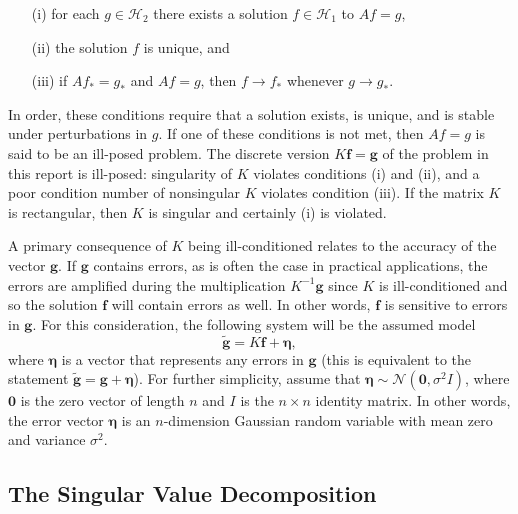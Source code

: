 \documentclass[12pt]{article}
\newcommand{\gVec}{\mathbf{g}}	%
\newcommand{\gnoiseVec}{\widetilde{\mathbf{g}}}	%
\newcommand{\kMat}{K}	%
\newcommand{\fVec}{\mathbf{f}}	%
\newcommand{\noise}{\eta}	%
\newcommand{\noiseSD}{\sigma}	%
\newcommand{\noiseVec}{\bm{\noise}}	%
\begin{document}
\begin{enumerate}
\item[(i)] for each $g \in \mathcal{H}_2$ there exists a solution $f \in \mathcal{H}_1$ to $Af = g$,
\item[(ii)] the solution $f$ is unique, and
\item[(iii)] if $Af_* = g_*$ and $Af = g$, then $f \rightarrow f_*$ whenever $g \rightarrow g_*$.
\end{enumerate}
In order, these conditions require that a solution exists, is unique, and is stable under perturbations in $g$. If one of these conditions is not met, then $Af = g$ is said to be an ill-posed problem. The discrete version $\kMat\fVec = \gVec$ of the problem in this report is ill-posed: singularity of $\kMat$ violates conditions (i) and (ii), and a poor condition number of nonsingular $\kMat$ violates condition (iii). If the matrix $\kMat$ is rectangular, then $\kMat$ is singular and certainly (i) is violated.  \par 
A primary consequence of $\kMat$ being ill-conditioned relates to the accuracy of the vector $\gVec$. If $\gVec$ contains errors, as is often the case in practical applications, the errors are amplified during the multiplication $\kMat^{-1}\gVec$ since $\kMat$ is ill-conditioned and so the solution $\fVec$ will contain errors as well. In other words, $\fVec$ is sensitive to errors in $\gVec$. For this consideration, the following system will be the assumed model
\begin{equation}
\gnoiseVec = \kMat\fVec + \noiseVec,
\label{eq:DisNoise}
\end{equation}
where $\noiseVec$ is a vector that represents any errors in $\gVec$ (this is equivalent to the statement $\gnoiseVec = \gVec + \noiseVec$). For further simplicity, assume that $\noiseVec \sim \mathcal{N}(\bm{0},\noiseSD^2I)$, where $\bm{0}$ is the zero vector of length $n$ and $I$ is the $n \times n$ identity matrix. In other words, the error vector $\noiseVec$ is an $n$-dimension Gaussian random variable with mean zero and variance $\noiseSD^2$. 

\subsection{The Singular Value Decomposition} \label{sec:SVD}
\end{document}
